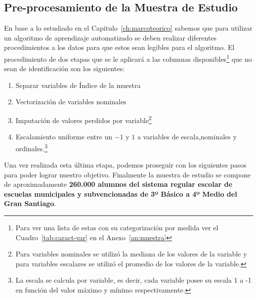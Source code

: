 \subsection{Pre-procesamiento de la Muestra de Estudio}
En base a lo estudiado en el Capitulo~\ref{ch:marcoteorico} sabemos que para utilizar un algoritmo de aprendizaje automatizado se deben realizar diferentes procedimientos a los datos para que estos sean legibles para el algoritmo. El procedimiento de dos etapas que se le aplicará a las columnas disponibles\footnote{Para ver una lista de estas con su categorización por medida ver el Cuadro~\ref{tab:caract-var} en el Anexo~\ref{an:muestra}} que no sean de identificación son los siguientes:
\begin{enumerate}[label=\Roman*]
\item Separar variables de Índice de la muestra
\item Vectorización de variables nominales
\item Imputación de valores perdidos por variable\footnote{Para variables nominales se utilizó la mediana de los valores de la variable y para variables escalares se utilizó el promedio de los valores de la variable. }
\item Escalamiento uniforme entre un $-1$ y $1$ a variables de escala,nominales y ordinales.\footnote{La escala se calcula por variable, es decir, cada variable posee su escala 1 a -1 en función del valor máximo y mínimo respectivamente.}
\end{enumerate}

Una vez realizada esta última etapa, podemos proseguir con los siguientes pasos para poder lograr nuestro objetivo. Finalmente la muestra de estudio se compone de aproximadamente \textbf{260.000 alumnos del sistema regular escolar de escuelas municipales y subvencionadas de 3º Básico a 4º Medio del Gran Santiago}.


